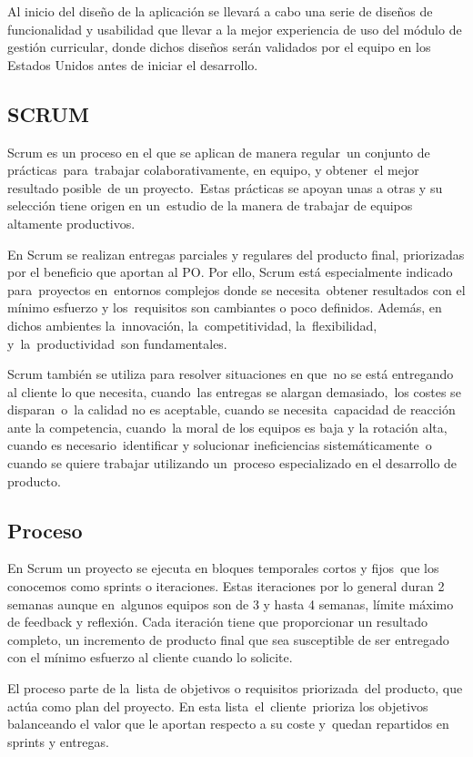 Al inicio del diseño de la aplicación se llevará a cabo una serie de diseños de funcionalidad y usabilidad que llevar a la mejor experiencia de uso del módulo de gestión curricular, donde dichos diseños serán validados por el equipo en los Estados Unidos antes de iniciar el desarrollo.

\subsection{SCRUM}
Scrum es un proceso en el que se aplican de manera regular un conjunto de prácticas para trabajar colaborativamente, en equipo, y obtener el mejor resultado posible de un proyecto. Estas prácticas se apoyan unas a otras y su selección tiene origen en un estudio de la manera de trabajar de equipos altamente productivos.

En Scrum se realizan entregas parciales y regulares del producto final, priorizadas por el beneficio que aportan al PO. Por ello, Scrum está especialmente indicado para proyectos en entornos complejos donde se necesita obtener resultados con el mínimo esfuerzo y los requisitos son cambiantes o poco definidos. Además, en dichos ambientes la innovación, la competitividad, la flexibilidad, y la productividad son fundamentales.

Scrum también se utiliza para resolver situaciones en que no se está entregando al cliente lo que necesita, cuando las entregas se alargan demasiado, los costes se disparan o la calidad no es aceptable, cuando se necesita capacidad de reacción ante la competencia, cuando la moral de los equipos es baja y la rotación alta, cuando es necesario identificar y solucionar ineficiencias sistemáticamente o cuando se quiere trabajar utilizando un proceso especializado en el desarrollo de producto. 

\subsection{Proceso}
En Scrum un proyecto se ejecuta en bloques temporales cortos y fijos que los conocemos como sprints o iteraciones. Estas iteraciones por lo general duran 2 semanas aunque en algunos equipos son de 3 y hasta 4 semanas, límite máximo de feedback y reflexión\citep{davis_agile_2015}. Cada iteración tiene que proporcionar un resultado completo, un incremento de producto final que sea susceptible de ser entregado con el mínimo esfuerzo al cliente cuando lo solicite.

El proceso parte de la lista de objetivos o requisitos priorizada del producto, que actúa como plan del proyecto. En esta lista el cliente prioriza los objetivos balanceando el valor que le aportan respecto a su coste y quedan repartidos en sprints y entregas.

